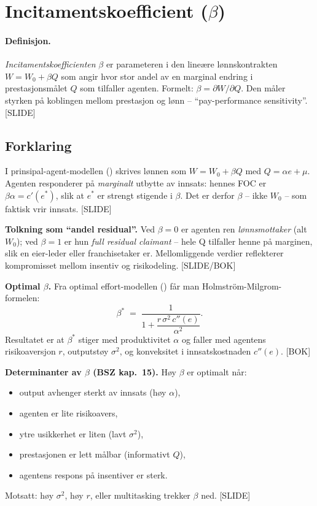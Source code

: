 \section{Incitamentskoefficient ($\beta$)}\label{thr:incentive-coefficient}

\paragraph{Definisjon.} \emph{Incitamentskoefficienten} $\beta$ er parameteren i den lineære lønnskontrakten $W=W_0+\beta Q$ som angir hvor stor andel av en marginal endring i prestasjonsmålet $Q$ som tilfaller agenten. Formelt: $\beta=\partial W/\partial Q$. Den måler styrken på koblingen mellom prestasjon og lønn -- ``pay-performance sensitivity''. [SLIDE]

\subsection*{Forklaring}

I prinsipal-agent-modellen () skrives lønnen som $W=W_0+\beta Q$ med $Q=\alpha e+\mu$. Agenten responderer på \emph{marginalt} utbytte av innsats: hennes FOC er $\beta\alpha=c'(e^{*})$, slik at $e^{*}$ er strengt stigende i $\beta$. Det er derfor $\beta$ -- ikke $W_0$ -- som faktisk vrir innsats. [SLIDE]

\textbf{Tolkning som ``andel residual''.} Ved $\beta=0$ er agenten ren \emph{lønnsmottaker} (alt $W_0$); ved $\beta=1$ er hun \emph{full residual claimant} -- hele Q tilfaller henne på marginen, slik en eier-leder eller franchisetaker er. Mellomliggende verdier reflekterer kompromisset mellom insentiv og risikodeling. [SLIDE/BOK]

\textbf{Optimal $\beta$.} Fra optimal effort-modellen () får man Holmström-Milgrom-formelen:
\[
\beta^{*}\;=\;\frac{1}{1+\dfrac{r\,\sigma^{2}\,c''(e)}{\alpha^{2}}}.
\]
Resultatet er at $\beta^{*}$ stiger med produktivitet $\alpha$ og faller med agentens risikoaversjon $r$, outputstøy $\sigma^{2}$, og konveksitet i innsatskostnaden $c''(e)$. [BOK]

\textbf{Determinanter av $\beta$ (BSZ kap.\ 15).} Høy $\beta$ er optimalt når:
\begin{itemize}\setlength{\itemsep}{1pt}
\item output avhenger sterkt av innsats (høy $\alpha$),
\item agenten er lite risikoavers,
\item ytre usikkerhet er liten (lavt $\sigma^{2}$),
\item prestasjonen er lett målbar (informativt $Q$),
\item agentens respons på insentiver er sterk.
\end{itemize}
Motsatt: høy $\sigma^{2}$, høy $r$, eller multitasking trekker $\beta$ ned. [SLIDE]

